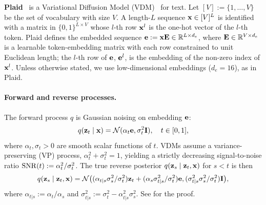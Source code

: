 \documentclass{article}
\begin{document}
%

\textbf{Plaid}~\citep{gulrajani2023plaid} is a Variational Diffusion Model (VDM)~\citep{kingma2021variational} for text.
Let $[V] := \{1, \ldots, V\}$ be the set of vocabulary with size $V$. A length-$L$ sequence ${\mathbf x} \in [V]^L$ is identified with a matrix in $\{0, 1\}^{L \times V}$ whose $l$-th row ${\mathbf x}^l$ is the one-hot vector of the $l$-th token. Plaid defines the embedded sequence ${\mathbf e} := {\mathbf x} {\mathbf E} \in \mathbb{R}^{L \times d_e}$, where ${\mathbf E}\in\mathbb{R}^{V \times d_e}$ is a learnable token-embedding matrix with each row constrained to unit Euclidean length; the $l$-th row of ${\mathbf e}$, ${\mathbf e}^l$, is the embedding of the non-zero index of ${\mathbf x}^l$. Unless otherwise stated, we use low-dimensional embeddings ($d_e = 16$), as in Plaid.
%

\paragraph{Forward and reverse processes.} The forward process $q$ is Gaussian noising on embedding ${\mathbf e}$:
\begin{align}\label{eq:vdm-forward}
q ({\mathbf z}_t \mid {\mathbf x}) = \mathcal{N}(\alpha_t {\mathbf e}, \sigma_t^2 {\mathbf I}),\quad t\in[0,1],
\end{align}
where $\alpha_t,\sigma_t>0$ are smooth scalar functions of $t$. VDMs assume a variance-preserving (VP) process, $\alpha_t^2+\sigma_t^2=1$, yielding a strictly decreasing signal-to-noise ratio ${\mathrm{SNR}}(t):=\alpha_t^2/\sigma_t^2$. The true reverse posterior $q({\mathbf z}_s \mid {\mathbf z}_t, {\mathbf x})$ for $s<t$ is then
%
\begin{align}\label{eq:vdm-reverse}
q({\mathbf z}_s \mid {\mathbf z}_t, {\mathbf x}) = \mathcal{N}\big((\alpha_{t|s}\sigma^2_s/\sigma_t^2) {\mathbf z}_t + (\alpha_s \sigma^2_{t|s}/\sigma^2_t) {\mathbf e}, (\sigma^2_{t|s} \sigma^2_s/\sigma^2_t) {\mathbf I}\big),
\end{align}
%
where $\alpha_{t|s}:=\alpha_t/\alpha_s$ and $\sigma^2_{t|s}:=\sigma_t^2-\alpha_{t|s}^2\sigma_s^2$. See \citep[App. A.2]{kingma2021variational} for the proof.

%
\end{document}
